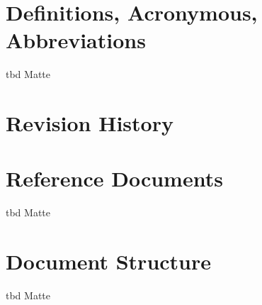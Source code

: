 \section{Definitions, Acronymous, Abbreviations}

tbd Matte


\section{Revision History}
\section{Reference Documents}

tbd Matte


\section{Document Structure}

tbd Matte